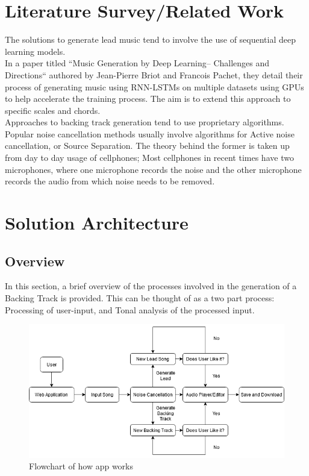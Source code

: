 \documentclass[12pt]{report}
\begin{document}
\chapter{Literature Survey/Related Work} 
The solutions to generate lead music tend to involve the use of sequential deep learning models.\\In a paper titled ``Music Generation by Deep Learning– Challenges and Directions`` authored by Jean-Pierre Briot and Francois Pachet, they detail their process of generating music using RNN-LSTMs on multiple datasets using GPUs to help accelerate the training process. The aim is to extend this approach to specific scales and chords. \\Approaches to backing track generation tend to use proprietary algorithms. \\Popular noise cancellation methods usually involve algorithms for Active noise cancellation, or Source Separation. The theory behind the former is taken up from day to day usage of cellphones; Most cellphones in recent times have two microphones, where one microphone records the noise and the other microphone records the audio from which noise needs to be removed.
\chapter{Solution Architecture}
\section{Overview}
In this section, a brief overview of the processes involved in the generation of a Backing Track is provided. This can be thought of as a two part process: Processing of user-input, and Tonal analysis of the processed input. 

\begin{figure}[ht]
  \includegraphics[width =\columnwidth]{FlowChart_overall.png}
  \caption{Flowchart of how app works}
  \label{flowchart_overall}
\end{figure}
\end{document}

